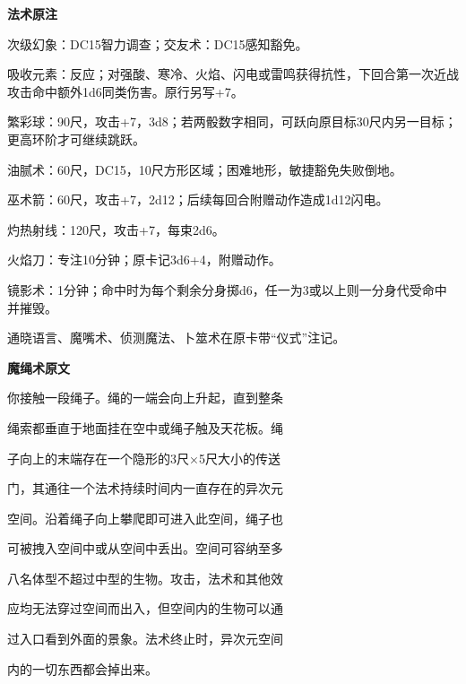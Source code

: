 \documentclass[letterpaper,openany,twoside,twocolumn]{book}
\begin{document}
\par\noindent\textbf{法术原注}\par
次级幻象：DC15智力调查；交友术：DC15感知豁免。\par
吸收元素：反应；对强酸、寒冷、火焰、闪电或雷鸣获得抗性，下回合第一次近战攻击命中额外1d6同类伤害。原行另写+7。\par
繁彩球：90尺，攻击+7，3d8；若两骰数字相同，可跃向原目标30尺内另一目标；更高环阶才可继续跳跃。\par
油腻术：60尺，DC15，10尺方形区域；困难地形，敏捷豁免失败倒地。\par
巫术箭：60尺，攻击+7，2d12；后续每回合附赠动作造成1d12闪电。\par
灼热射线：120尺，攻击+7，每束2d6。\par
火焰刀：专注10分钟；原卡记3d6+4，附赠动作。\par
镜影术：1分钟；命中时为每个剩余分身掷d6，任一为3或以上则一分身代受命中并摧毁。\par
通晓语言、魔嘴术、侦测魔法、卜筮术在原卡带“仪式”注记。\par


\par\noindent\textbf{魔绳术原文}\par
你接触一段绳子。绳的一端会向上升起，直到整条\par
绳索都垂直于地面挂在空中或绳子触及天花板。绳\par
子向上的末端存在一个隐形的3尺×5尺大小的传送\par
门，其通往一个法术持续时间内一直存在的异次元\par
空间。沿着绳子向上攀爬即可进入此空间，绳子也\par
可被拽入空间中或从空间中丢出。空间可容纳至多\par
八名体型不超过中型的生物。攻击，法术和其他效\par
应均无法穿过空间而出入，但空间内的生物可以通\par
过入口看到外面的景象。法术终止时，异次元空间\par
内的一切东西都会掉出来。\par
\end{document}
